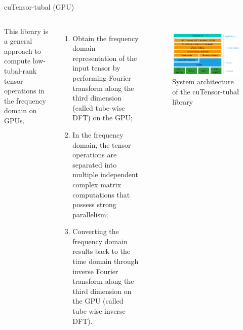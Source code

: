 \documentclass[t, 10pt, handout, aspectratio=169]{beamer}
\begin{document}
\begin{frame}{cuTensor-tubal (GPU)}

\begin{columns}
This library is a general approach to compute low-tubal-rank tensor operations in the frequency domain on GPUs.
\begin{enumerate}
  \item Obtain the frequency domain representation of the input tensor by performing Fourier transform along the third dimension (called tube-wise DFT) on the GPU;
  \item In the frequency domain, the tensor operations are separated into multiple independent complex matrix computations that possess strong parallelism;
  \item Converting the frequency domain results back to the time domain through inverse Fourier transform along the third dimension on the GPU (called tube-wise inverse DFT).
\end{enumerate}
\begin{figure}
	\centering  
	\includegraphics[width=\linewidth]{figs/cutensor_arch.png}\\
	System architecture of the cuTensor-tubal library
	\label{fig:cutensor_arch}
\end{figure}
\end{columns}
\end{frame}
\end{document}
